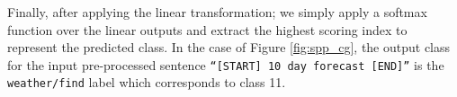 Finally, after applying the linear transformation; we simply apply a softmax
function over the linear outputs and extract the highest scoring index to
represent the predicted class. In the case of Figure \ref{fig:spp_cg}, the
output class for the input pre-processed sentence \texttt{``[START] 10 day
  forecast [END]''} is the \texttt{weather/find} label which corresponds to class 11.

